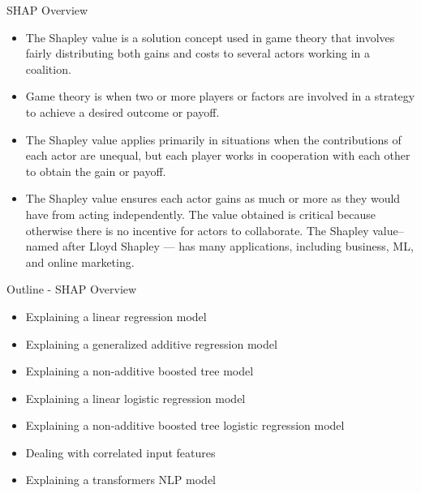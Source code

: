 \documentclass[aspectratio=169]{beamer}
\begin{document}
\begin{frame}{\ac{SHAP} Overview}
    \begin{itemize}
        \item The Shapley value is a solution concept used in game theory that involves fairly distributing both gains and costs to several actors working in a coalition.
    
        \item Game theory is when two or more players or factors are involved in a strategy to achieve a desired outcome or payoff.
    
        \item The Shapley value applies primarily in situations when the contributions of each actor are unequal, but each player works in cooperation with each other to obtain the gain or payoff.

        \item The Shapley value ensures each actor gains as much or more as they would have from acting independently. The value obtained is critical because otherwise there is no incentive for actors to collaborate. The Shapley value–named after Lloyd Shapley --- has many applications, including business, \ac{ML}, and online marketing.
        
    \end{itemize}
\end{frame}

\begin{frame}{Outline - \ac{SHAP} Overview}
    \begin{itemize}
        \item Explaining a linear regression model
        \item Explaining a generalized additive regression model
        \item Explaining a non-additive boosted tree model
        \item Explaining a linear logistic regression model
        \item Explaining a non-additive boosted tree logistic regression model
        \item Dealing with correlated input features
        \item Explaining a transformers NLP model
    \end{itemize}
\end{frame}
\end{document}
